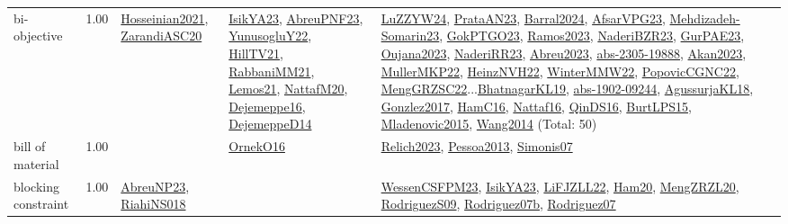 {\begin{longtable}{p{3cm}r>{\raggedright\arraybackslash}p{6cm}>{\raggedright\arraybackslash}p{6cm}>{\raggedright\arraybackslash}p{8cm}}
\index{bi-objective}\index{Concepts!bi-objective}bi-objective &  1.00 & \hyperref[detail:Hosseinian2021]{Hosseinian2021}, \hyperref[detail:ZarandiASC20]{ZarandiASC20} & \hyperref[detail:IsikYA23]{IsikYA23}, \hyperref[detail:AbreuPNF23]{AbreuPNF23}, \hyperref[detail:YunusogluY22]{YunusogluY22}, \hyperref[detail:HillTV21]{HillTV21}, \hyperref[detail:RabbaniMM21]{RabbaniMM21}, \hyperref[detail:Lemos21]{Lemos21}, \hyperref[detail:NattafM20]{NattafM20}, \hyperref[detail:Dejemeppe16]{Dejemeppe16}, \hyperref[detail:DejemeppeD14]{DejemeppeD14} & \hyperref[detail:LuZZYW24]{LuZZYW24}, \hyperref[detail:PrataAN23]{PrataAN23}, \hyperref[detail:Barral2024]{Barral2024}, \hyperref[detail:AfsarVPG23]{AfsarVPG23}, \hyperref[detail:Mehdizadeh-Somarin23]{Mehdizadeh-Somarin23}, \hyperref[detail:GokPTGO23]{GokPTGO23}, \hyperref[detail:Ramos2023]{Ramos2023}, \hyperref[detail:NaderiBZR23]{NaderiBZR23}, \hyperref[detail:GurPAE23]{GurPAE23}, \hyperref[detail:Oujana2023]{Oujana2023}, \hyperref[detail:NaderiRR23]{NaderiRR23}, \hyperref[detail:Abreu2023]{Abreu2023}, \hyperref[detail:abs-2305-19888]{abs-2305-19888}, \hyperref[detail:Akan2023]{Akan2023}, \hyperref[detail:MullerMKP22]{MullerMKP22}, \hyperref[detail:HeinzNVH22]{HeinzNVH22}, \hyperref[detail:WinterMMW22]{WinterMMW22}, \hyperref[detail:PopovicCGNC22]{PopovicCGNC22}, \hyperref[detail:MengGRZSC22]{MengGRZSC22}...\hyperref[detail:BhatnagarKL19]{BhatnagarKL19}, \hyperref[detail:abs-1902-09244]{abs-1902-09244}, \hyperref[detail:AgussurjaKL18]{AgussurjaKL18}, \hyperref[detail:Gonzlez2017]{Gonzlez2017}, \hyperref[detail:HamC16]{HamC16}, \hyperref[detail:Nattaf16]{Nattaf16}, \hyperref[detail:QinDS16]{QinDS16}, \hyperref[detail:BurtLPS15]{BurtLPS15}, \hyperref[detail:Mladenovic2015]{Mladenovic2015}, \hyperref[detail:Wang2014]{Wang2014} (Total: 50)\\
\index{bill of material}\index{Concepts!bill of material}bill of material &  1.00 &  & \hyperref[detail:OrnekO16]{OrnekO16} & \hyperref[detail:Relich2023]{Relich2023}, \hyperref[detail:Pessoa2013]{Pessoa2013}, \hyperref[detail:Simonis07]{Simonis07}\\
\index{blocking constraint}\index{Concepts!blocking constraint}blocking constraint &  1.00 & \hyperref[detail:AbreuNP23]{AbreuNP23}, \hyperref[detail:RiahiNS018]{RiahiNS018} &  & \hyperref[detail:WessenCSFPM23]{WessenCSFPM23}, \hyperref[detail:IsikYA23]{IsikYA23}, \hyperref[detail:LiFJZLL22]{LiFJZLL22}, \hyperref[detail:Ham20]{Ham20}, \hyperref[detail:MengZRZL20]{MengZRZL20}, \hyperref[detail:RodriguezS09]{RodriguezS09}, \hyperref[detail:Rodriguez07b]{Rodriguez07b}, \hyperref[detail:Rodriguez07]{Rodriguez07}\\

\end{longtable}}
